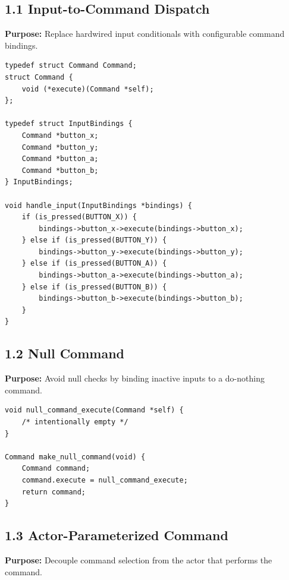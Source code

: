 \documentclass[10pt,letterpaper]{article}
\begin{document}
\subsection{1.1 Input-to-Command Dispatch}

\textbf{Purpose:} Replace hardwired input conditionals with configurable command bindings.

\begin{verbatim}
typedef struct Command Command;
struct Command {
    void (*execute)(Command *self);
};

typedef struct InputBindings {
    Command *button_x;
    Command *button_y;
    Command *button_a;
    Command *button_b;
} InputBindings;

void handle_input(InputBindings *bindings) {
    if (is_pressed(BUTTON_X)) {
        bindings->button_x->execute(bindings->button_x);
    } else if (is_pressed(BUTTON_Y)) {
        bindings->button_y->execute(bindings->button_y);
    } else if (is_pressed(BUTTON_A)) {
        bindings->button_a->execute(bindings->button_a);
    } else if (is_pressed(BUTTON_B)) {
        bindings->button_b->execute(bindings->button_b);
    }
}
\end{verbatim}

\subsection{1.2 Null Command}

\textbf{Purpose:} Avoid null checks by binding inactive inputs to a do-nothing command.

\begin{verbatim}
void null_command_execute(Command *self) {
    /* intentionally empty */
}

Command make_null_command(void) {
    Command command;
    command.execute = null_command_execute;
    return command;
}
\end{verbatim}

\subsection{1.3 Actor-Parameterized Command}

\textbf{Purpose:} Decouple command selection from the actor that performs the command.
\end{document}
